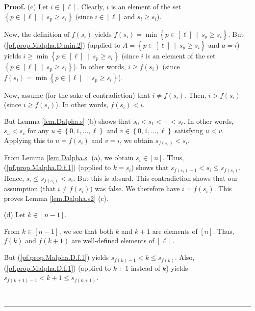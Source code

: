 \documentclass[numbers=enddot,12pt,final,onecolumn,notitlepage,abstracton]{scrartcl}
\theoremstyle{definition}
\newenvironment{proof}[1][Proof]{\noindent\textbf{#1.} }{\ \rule{0.5em}{0.5em}}
\newenvironment{verlong}{}{}
\begin{document}
\begin{verlong}
\begin{footnotesize}
\begin{proof}
(c) Let $i\in\left[  \ell\right]  $. Clearly, $i$ is an element of the set
$\left\{  p\in\left[  \ell\right]  \ \mid\ s_{p}\geq s_{i}\right\}  $ (since
$i\in\left[  \ell\right]  $ and $s_{i}\geq s_{i}$).

Now, the definition of $f\left(  s_{i}\right)  $ yields $f\left(
s_{i}\right)  =\min\left\{  p\in\left[  \ell\right]  \ \mid\ s_{p}\geq
s_{i}\right\}  $. But (\ref{pf.prop.Malpha.D.min.2}) (applied to $A=\left\{
p\in\left[  \ell\right]  \ \mid\ s_{p}\geq s_{i}\right\}  $ and $a=i$) yields
$i\geq\min\left\{  p\in\left[  \ell\right]  \ \mid\ s_{p}\geq s_{i}\right\}  $
(since $i$ is an element of the set $\left\{  p\in\left[  \ell\right]
\ \mid\ s_{p}\geq s_{i}\right\}  $). In other words, $i\geq f\left(
s_{i}\right)  $ (since $f\left(  s_{i}\right)  =\min\left\{  p\in\left[
\ell\right]  \ \mid\ s_{p}\geq s_{i}\right\}  $).

Now, assume (for the sake of contradiction) that $i\neq f\left(  s_{i}\right)
$. Then, $i>f\left(  s_{i}\right)  $ (since $i\geq f\left(  s_{i}\right)  $).
In other words, $f\left(  s_{i}\right)  <i$.

But Lemma \ref{lem.Dalpha.s} (b) shows that $s_{0}<s_{1}<\cdots<s_{\ell}$. In
other words, $s_{u}<s_{v}$ for any $u\in\left\{  0,1,\ldots,\ell\right\}  $
and $v\in\left\{  0,1,\ldots,\ell\right\}  $ satisfying $u<v$. Applying this
to $u=f\left(  s_{i}\right)  $ and $v=i$, we obtain $s_{f\left(  s_{i}\right)
}<s_{i}$.

From Lemma \ref{lem.Dalpha.s} (a), we obtain $s_{i}\in\left[  n\right]  $.
Thus, (\ref{pf.prop.Malpha.D.f.1}) (applied to $k=s_{i}$) shows that
$s_{f\left(  s_{i}\right)  -1}<s_{i}\leq s_{f\left(  s_{i}\right)  }$. Hence,
$s_{i}\leq s_{f\left(  s_{i}\right)  }<s_{i}$. But this is absurd. This
contradiction shows that our assumption (that $i\neq f\left(  s_{i}\right)  $)
was false. We therefore have $i=f\left(  s_{i}\right)  $. This proves Lemma
\ref{lem.Dalpha.s2} (c).

(d) Let $k\in\left[  n-1\right]  $.

From $k\in\left[  n-1\right]  $, we see that both $k$ and $k+1$ are elements
of $\left[  n\right]  $. Thus, $f\left(  k\right)  $ and $f\left(  k+1\right)
$ are well-defined elements of $\left[  \ell\right]  $.

But (\ref{pf.prop.Malpha.D.f.1}) yields $s_{f\left(  k\right)  -1}<k\leq
s_{f\left(  k\right)  }$. Also, (\ref{pf.prop.Malpha.D.f.1}) (applied to $k+1$
instead of $k$) yields $s_{f\left(  k+1\right)  -1}<k+1\leq s_{f\left(
k+1\right)  }$.


\end{proof}
\end{footnotesize}
\end{verlong}
\end{document}
